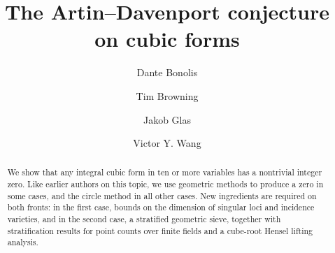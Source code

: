 \documentclass[a4paper,11pt, twoside,reqno]{amsart}
\theoremstyle{plain}
\theoremstyle{definition}
\theoremstyle{remark}
\numberwithin{equation}{section}
\begin{document}
\title{The Artin--Davenport conjecture on cubic forms}

\begin{abstract}
We show that
any integral cubic form in ten or more variables
has a nontrivial integer zero.
Like earlier authors on this topic,
we use geometric methods to produce a zero in some cases,
and the circle method in all other cases.
New ingredients are required on both fronts:
in the first case,
bounds on the dimension of singular loci and incidence varieties,
and in the second case,
a stratified geometric sieve, 
together with stratification results for point counts over finite fields and a 
cube-root Hensel lifting analysis.
\end{abstract}

\author{Dante Bonolis}
\address{TU Graz\\ Steyrergasse  30\\ 8010 Graz\\ Austria}


\author{Tim Browning}
\address{ISTA\\
Am Campus 1\\
3400 Klosterneuburg\\
Austria}
\address{Department of Mathematics\\ Imperial College London\\
SW7 2AZ\\ 
United Kingdom}


\author{Jakob Glas}
\address{Leibniz Universit\"at Hannover\\ Welfengarten 1\\ 30167 Hannover\\ Germany}
\address{Laboratoire de math\'ematiques d’Orsay\\ Universit\'e Paris Saclay\\ Orsay\\ France}


\author{Victor Y. Wang}

\address{Institute of Mathematics\\
Academia Sinica\\
Taipei 106319\\
Taiwan}

\maketitle
\end{document}
